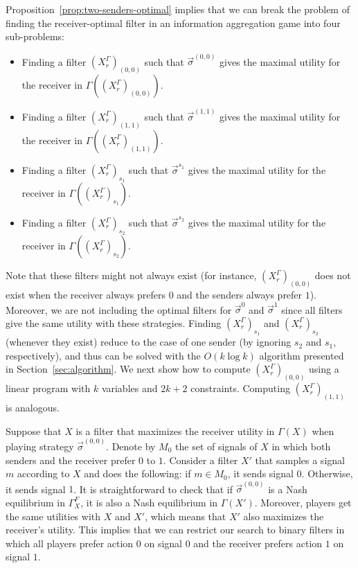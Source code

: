 \documentclass[submission,copyright,creativecommons]{eptcs}
\begin{document}
Proposition~\ref{prop:two-senders-optimal} implies that we can break the problem of finding the receiver-optimal filter in an information aggregation game into four sub-problems:
\begin{itemize}
    \item[(a)] Finding a filter $(X_r^\Gamma)_{(0,0)}$ such that $\vec{\sigma}^{(0,0)}$ gives the maximal utility for the receiver in $\Gamma((X_r^\Gamma)_{(0,0)})$.
    \item[(b)] Finding a filter $(X_r^\Gamma)_{(1,1)}$ such that $\vec{\sigma}^{(1,1)}$ gives the maximal utility for the receiver in $\Gamma((X_r^\Gamma)_{(1,1)})$.
    \item[(c)] Finding a filter $(X_r^\Gamma)_{s_1}$ such that $\vec{\sigma}^{s_1}$ gives the maximal utility for the receiver in $\Gamma((X_r^\Gamma)_{s_1})$.
    \item[(d)] Finding a filter $(X_r^\Gamma)_{s_2}$ such that $\vec{\sigma}^{s_2}$ gives the maximal utility for the receiver in $\Gamma((X_r^\Gamma)_{s_2})$.
\end{itemize}

Note that these filters might not always exist (for instance, $(X_r^\Gamma)_{(0,0)}$ does not exist when the receiver always prefers $0$ and the senders always prefer $1$). Moreover, we are not including the optimal filters for $\vec{\sigma}^0$ and $\vec{\sigma}^1$ since all filters give the same utility with these strategies. Finding $(X_r^\Gamma)_{s_1}$ and $(X_r^\Gamma)_{s_2}$ (whenever they exist) reduce to the case of one sender (by ignoring $s_2$ and $s_1$, respectively), and thus can be solved with the $O(k \log k)$ algorithm presented in Section~\ref{sec:algorithm}. We next show how to compute $(X_r^\Gamma)_{(0,0)}$ using a linear program with $k$ variables and $2k+2$ constraints. Computing $(X_r^\Gamma)_{(1,1)}$ is analogous.

Suppose that $X$ is a filter that maximizes the receiver utility in $\Gamma(X)$ when playing strategy $\vec{\sigma}^{(0,0)}$. Denote by $M_0$ the set of signals of $X$ in which both senders and the receiver prefer $0$ to $1$. Consider a filter $X'$ that samples a signal $m$ according to $X$ and does the following: if $m \in M_0$, it sends signal $0$. Otherwise, it sends signal $1$. It is straightforward to check that if $\vec{\sigma}^{(0,0)}$ is a Nash equilibrium in $\Gamma^F_X$, it is also a Nash equilibrium in $\Gamma(X')$. Moreover, players get the same utilities with $X$ and $X'$, which means that $X'$ also maximizes the receiver's utility. This implies that we can restrict our search to binary filters in which all players prefer action $0$ on signal $0$ and the receiver prefers action $1$ on signal $1$. 
\end{document}
